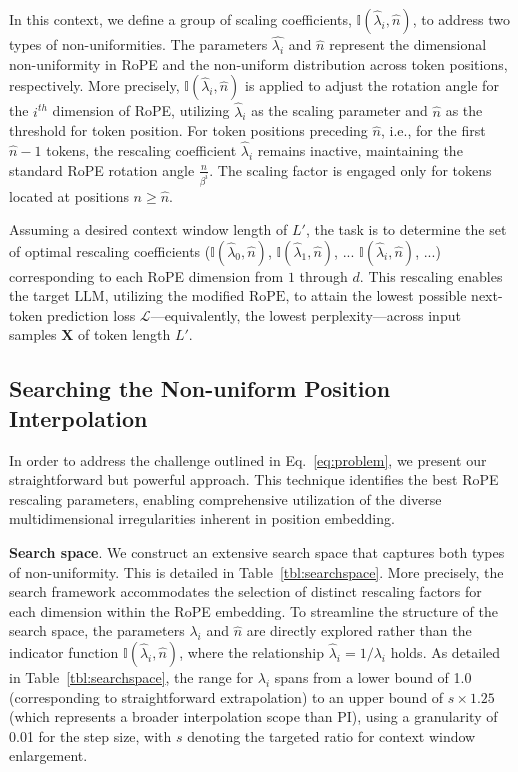 In this context, we define a group of scaling coefficients, $\mathbb{I}(\hat{\lambda}_{i},\hat{n})$, to address two types of non-uniformities. The parameters $\hat{\lambda_i}$ and $\hat{n}$ represent the dimensional non-uniformity in RoPE and the non-uniform distribution across token positions, respectively. More precisely, $\mathbb{I}(\hat{\lambda}_{i},\hat{n})$ is applied to adjust the rotation angle for the $i^{th}$ dimension of RoPE, utilizing $\hat{\lambda}_{i}$ as the scaling parameter and $\hat{n}$ as the threshold for token position. For token positions preceding $\hat{n}$, i.e., for the first $\hat{n}-1$ tokens, the rescaling coefficient $\hat{\lambda}_{i}$ remains inactive, maintaining the standard RoPE rotation angle $\frac{n}{\beta^i}$. The scaling factor is engaged only for tokens located at positions $n \ge \hat{n}$.

Assuming a desired context window length of $L'$, the task is to determine the set of optimal rescaling coefficients ($\mathbb{I}(\hat{\lambda}_{0},\hat{n})$, $\mathbb{I}(\hat{\lambda}_{1},\hat{n})$, ... $\mathbb{I}(\hat{\lambda}_{i},\hat{n})$, ...) corresponding to each RoPE dimension from $1$ through $d$. This rescaling enables the target $\text{LLM}$, utilizing the modified $\text{RoPE}$, to attain the lowest possible next-token prediction loss $\mathcal{L}$—equivalently, the lowest perplexity—across input samples $\mathbf{X}$ of token length $L'$.

\subsection{Searching the Non-uniform Position Interpolation}

In order to address the challenge outlined in Eq.~\ref{eq:problem}, we present our straightforward but powerful approach. This technique identifies the best RoPE rescaling parameters, enabling comprehensive utilization of the diverse multidimensional irregularities inherent in position embedding.

\textbf{Search space}. We construct an extensive search space that captures both types of non-uniformity. This is detailed in Table~\ref{tbl:searchspace}. More precisely, the search framework accommodates the selection of distinct rescaling factors for each dimension within the RoPE embedding. To streamline the structure of the search space, the parameters $\lambda_i$ and $\hat{n}$ are directly explored rather than the indicator function $\mathbb{I}(\hat{\lambda}_{i},\hat{n})$, where the relationship $\hat{\lambda}_{i}=1/\lambda_i$ holds. As detailed in Table~\ref{tbl:searchspace}, the range for $\lambda_i$ spans from a lower bound of 1.0 (corresponding to straightforward extrapolation) to an upper bound of $s\times1.25$ (which represents a broader interpolation scope than PI), using a granularity of 0.01 for the step size, with $s$ denoting the targeted ratio for context window enlargement.

